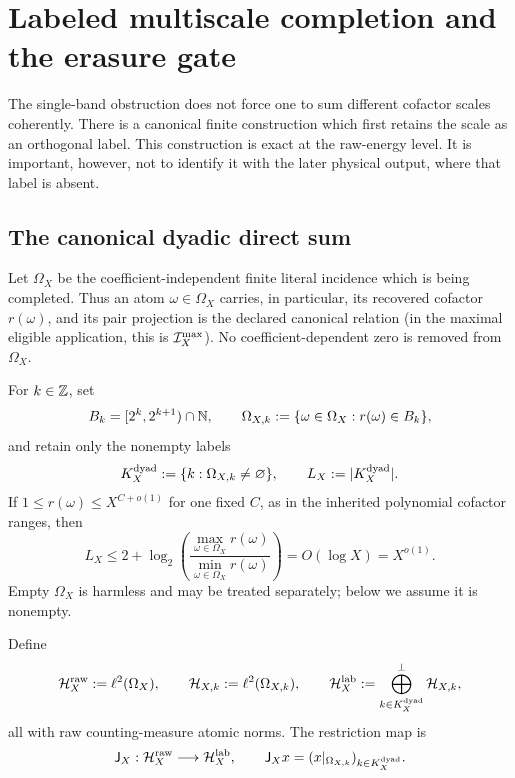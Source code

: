 \section{Labeled multiscale completion and the erasure gate}
\label{sec:tpc63-labeled-completion}

The single-band obstruction does not force one to sum different cofactor
scales coherently.  There is a canonical finite construction which first
retains the scale as an orthogonal label.  This construction is exact at
the raw-energy level.  It is important, however, not to identify it with
the later physical output, where that label is absent.

\subsection{The canonical dyadic direct sum}

Let \(\Omega_X\) be the coefficient-independent finite literal incidence
which is being completed.  Thus an atom \(\omega\in\Omega_X\) carries, in
particular, its recovered cofactor \(r(\omega)\), and its pair projection
is the declared canonical relation (in the maximal eligible application,
this is \(\mathcal I_X^{\max}\)).  No coefficient-dependent zero is removed from
\(\Omega_X\).

For \(k\in\mathbb Z\), set
\begin{equation}
 B_k=[2^k,2^{k+1})\cap\mathbb N,
 \qquad
 \Omega_{X,k}:=\{\omega\in\Omega_X:r(\omega)\in B_k\},
 \label{eq:tpc63-dyadic-atoms}
\end{equation}
and retain only the nonempty labels
\begin{equation}
 K_X^{\rm dyad}:=\{k:\Omega_{X,k}\ne\varnothing\},
 \qquad L_X:=|K_X^{\rm dyad}|.
 \label{eq:tpc63-nonempty-block-labels}
\end{equation}
If \(1\le r(\omega)\le X^{C+o(1)}\) for one fixed \(C\), as in the
inherited polynomial cofactor ranges, then
\begin{equation}
 L_X\le 2+\log_2\!\left(
       \frac{\max_{\omega\in\Omega_X}r(\omega)}
            {\min_{\omega\in\Omega_X}r(\omega)}
                         \right)
 =O(\log X)=X^{o(1)}.
 \label{eq:tpc63-logarithmic-label-count}
\end{equation}
Empty \(\Omega_X\) is harmless and may be treated separately; below we
assume it is nonempty.

Define
\begin{equation}
 \mathcal H_X^{\rm raw}:=\ell^2(\Omega_X),
 \qquad
 \mathcal H_{X,k}:=\ell^2(\Omega_{X,k}),
 \qquad
 \mathcal H_X^{\rm lab}:=
       \bigoplus_{k\in K_X^{\rm dyad}}^{\perp}\mathcal H_{X,k},
 \label{eq:tpc63-labelled-raw-spaces}
\end{equation}
all with raw counting-measure atomic norms.  The restriction map is
\begin{equation}
 \mathsf J_X:\mathcal H_X^{\rm raw}\longrightarrow\mathcal H_X^{\rm lab},
 \qquad
 \mathsf J_Xx=(x|_{\Omega_{X,k}})_{k\in K_X^{\rm dyad}}.
 \label{eq:tpc63-canonical-block-analysis}
\end{equation}

